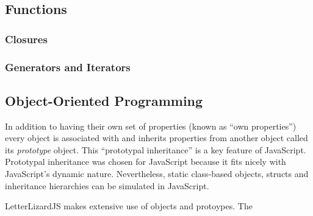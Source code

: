 \subsection{Functions}
\label{functions}


\subsubsection{Closures}
\label{closures}


\subsubsection{Generators and Iterators}


\subsection{Object-Oriented Programming}
\label{oop}


In addition to having their own set of properties (known as ``own properties'') every
object is associated with and inherits properties from another object called its
\emph{prototype} object. This ``prototypal inheritance'' is a key feature of JavaScript.
Prototypal inheritance was chosen for JavaScript because it fits nicely with JavaScript's
dynamic nature. Nevertheless, static class-based
objects, structs and inheritance hierarchies can be simulated in JavaScript. 

LetterLizardJS makes extensive use of objects and protoypes. The 

